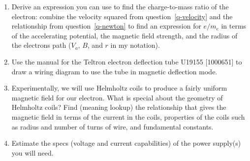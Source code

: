 \documentclass{tufte-handout}
\begin{document}
\begin{enumerate}
\item Derive an expression you can use to find the charge-to-mass ratio of the electron: combine the velocity squared from question~\ref{q-velocity} and the relationship from question~\ref{q-newton} to find an expression for $e/{m_e}$ in terms of the accelerating potential, the magnetic field strength, and the radius of the electrons path ($V_a$, $B$, and $r$ in my notation).  

\item Use the manual for the Teltron electron deflection tube U19155 [1000651] to draw a wiring diagram to use the tube in magnetic deflection mode.  

\item Experimentally, we will use Helmholtz coils to produce a fairly uniform magnetic field for our electron.  What is special about the geometry of Helmholtz coils?  Find (meaning lookup) the relationship that gives the magnetic field in terms of the current in the coils, properties of the coils such as radius and number of turns of wire, and fundamental constants.

\item Estimate the specs (voltage and current capabilities) of the power supply(s) you will need.

\end{enumerate}
\end{document}
